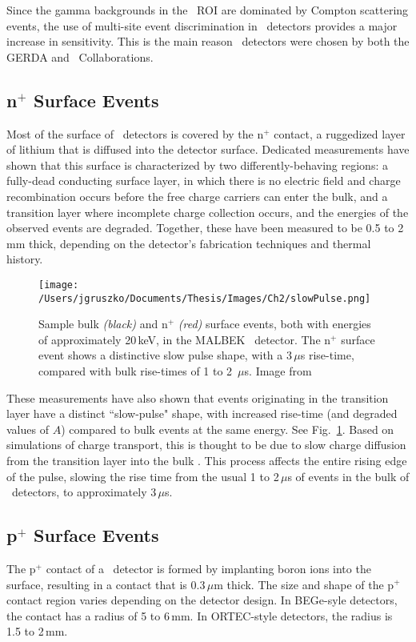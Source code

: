 Since the gamma backgrounds in the \nonubb\ ROI are dominated by Compton scattering events, the use of multi-site event discrimination in \ppc\ detectors provides a major increase in sensitivity. This is the main reason \ppc\ detectors were chosen by both the GERDA and \MJ\ Collaborations. 

\subsection{n$^+$ Surface Events}
Most of the surface of \ppc\ detectors is covered by the n$^+$ contact, a ruggedized layer of lithium that is diffused into the detector surface. Dedicated measurements have shown that this surface is characterized by two differently-behaving regions: a fully-dead conducting surface layer, in which there is no electric field and charge recombination occurs before the free charge carriers can enter the bulk, and a transition layer where incomplete charge collection occurs, and the energies of the observed events are degraded. Together, these have been measured to be 0.5 to 2\,mm thick, depending on the detector's fabrication techniques and thermal history. 

\begin{figure}[t]
 \centering
 \texttt{[image: /Users/jgruszko/Documents/Thesis/Images/Ch2/slowPulse.png]}
 \caption[A sample n$^+$ slow pulse]{Sample bulk \textit{(black)} and n$^+$ \textit{(red)} surface events, both with energies of approximately 20\,keV, in the MALBEK \ppc\ detector. The n$^+$ surface event shows a distinctive slow pulse shape, with a 3\,$\mu$s rise-time, compared with bulk rise-times of 1 to 2 \,$\mu$s. Image from \cite{MALBEK2015}} 
 \label{fig:slowPulse}
\end{figure}

These measurements have also shown that events originating in the transition layer have a distinct ``slow-pulse" shape, with increased rise-time (and degraded values of $A$) compared to bulk events at the same energy. See Fig.~\ref{fig:slowPulse}. Based on simulations of charge transport, this is thought to be due to slow charge diffusion from the transition layer into the bulk \cite{MJD_slowpulses}. This process affects the entire rising edge of the pulse, slowing the rise time from the usual 1 to 2\,$\mu$s of events in the bulk of \ppc\ detectors, to approximately 3\,$\mu$s.  

\subsection{p$^+$ Surface Events}
The p$^+$ contact of a \ppc\ detector is formed by implanting boron ions into the surface, resulting in a contact that is 0.3\,$\mu$m thick. The size and shape of the p$^+$ contact region varies depending on the detector design. In BEGe-syle detectors, the contact has a radius of 5 to 6\,mm. In ORTEC-style detectors, the radius is 1.5 to 2\,mm.  

